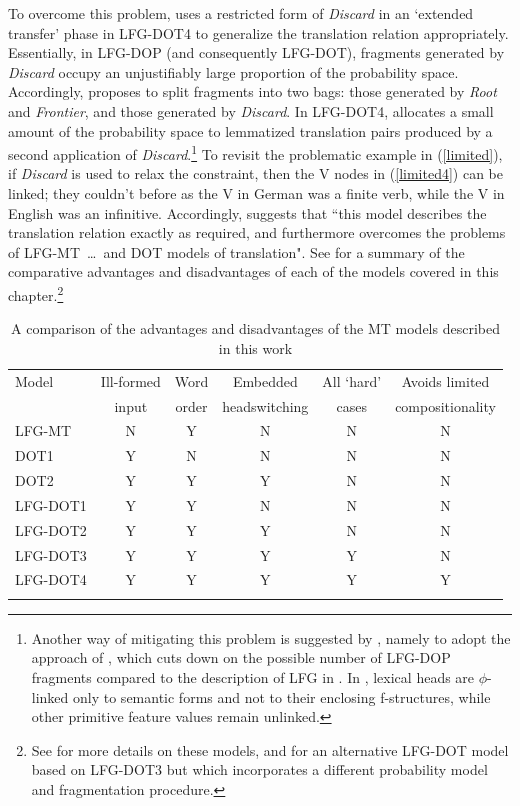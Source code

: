 \documentclass[output=paper,hidelinks]{langscibook}
\begin{document}
To overcome this problem, \citet{Way01} uses a restricted form
of {\em Discard} in an `extended transfer' phase in LFG-DOT4 to generalize the translation relation appropriately. Essentially, in LFG-DOP (and consequently LFG-DOT), fragments generated by {\em Discard} occupy an unjustifiably large proportion of the probability space. Accordingly, \citet{Way99} proposes to split fragments into two bags: those generated by {\em Root} and {\em Frontier}, and those generated by {\em Discard}. In LFG-DOT4, \citet{Way01} allocates a small amount of the probability space to
lemmatized translation pairs produced by a second application of {\em Discard}.\footnote{Another way of mitigating this problem is suggested by \citet[112]{Way01}, namely to adopt the approach of \citet{zaenen-kaplan1995}, which cuts down on the
possible number of LFG-DOP fragments compared to the description of LFG in \citet{kaplanbresnan82}. In \citet{zaenen-kaplan1995}, lexical heads are $\phi$-linked only to semantic forms and not to their enclosing f-structures, while other primitive feature values remain unlinked.}  
To revisit the problematic example in (\ref{limited}), if {\em Discard} is used to relax the \TENSE constraint, then the V nodes in (\ref{limited4}) can be linked; they couldn't before as the V in German was a finite verb, while the V in English was an infinitive.
Accordingly,  \citet[190]{Way01} suggests that ``this model describes the translation relation exactly as required, and furthermore overcomes the problems of LFG-MT~\ldots~and DOT models of translation". See  for a summary of the comparative advantages and disadvantages of each of the models covered in this chapter.\footnote{See \citet{Way03} for more details on these models, and \citet{Hearne} for an alternative LFG-DOT model based on LFG-DOT3 but which incorporates a different probability model and fragmentation procedure.}

\begin{table}
    \begin{tabularx}{\textwidth}{X@{~}cc@{~}c@{~}cc}
        \lsptoprule
            Model & Ill-formed & Word & Embedded & All `hard' & Avoids limited\\
         &  input &  order & headswitching & cases & compositionality \\
         \midrule
         LFG-MT & N & Y & N & N & N \\ \midrule
         DOT1 & Y & N & N & N & N\\
         DOT2 & Y & Y & Y & N & N \\ \midrule
         LFG-DOT1 & Y & Y & N & N & N \\
         LFG-DOT2 & Y & Y & Y & N & N \\
         LFG-DOT3 & Y & Y & Y & Y & N \\
         LFG-DOT4 & Y & Y & Y & Y & Y \\ \lspbottomrule
    \end{tabularx}
    \caption{A comparison of the advantages and disadvantages of the MT models described in this work}
    \label{advantages}
\end{table}
\end{document}
